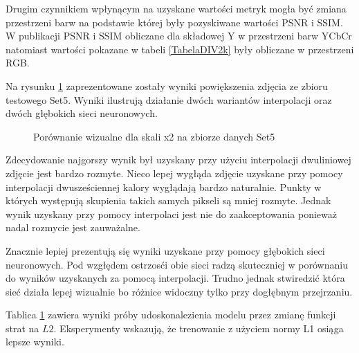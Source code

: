 \documentclass[a4paper,12pt,twoside,openany]{report}
\newcommand{\ImgPath}{.}
\begin{document}
Drugim czynnikiem wpłynącym na uzyskane wartości metryk mogła być zmiana przestrzeni barw na podstawie której były pozyskiwane wartości PSNR i  SSIM. W publikacji PSNR i SSIM obliczane dla składowej Y w przestrzeni barw YCbCr natomiast wartości pokazane w tabeli \ref{TabelaDIV2k} były obliczane w  przestrzeni RGB.

Na rysunku \ref{fig:DIv2k}  zaprezentowane zostały wyniki powiększenia zdjęcia ze zbioru testowego Set5. Wyniki ilustrują działanie dwóch wariantów interpolacji oraz dwóch głębokich sieci neuronowych. 

\begin{figure}[!htbp]
	\centering
	\caption{Porównanie wizualne dla skali  x2 na zbiorze danych Set5}
	\label{fig:DIv2k}
\end{figure}

Zdecydowanie najgorszy wynik był uzyskany przy użyciu interpolacji dwuliniowej zdjęcie jest bardzo rozmyte. Nieco lepej wygłąda zdjęcie uzyskane przy pomocy interpolacji dwusześciennej kalory wygłądają bardzo naturalnie. Punkty w których występują skupienia takich samych pikseli są mniej rozmyte. Jednak wynik uzyskany przy pomocy interpolaci jest nie do zaakceptowania ponieważ nadal rozmycie jest zauważalne.

Znacznie lepiej prezentują  się wyniki uzyskane przy pomocy głębokich sieci neuronowych. Pod wzgłędem ostrzosći obie sieci  radzą skuteczniej w porównaniu do wyników uzyskanych za  pomocą interpolacji. Trudno jednak stwiredzić która sieć działa lepej wizualnie  bo różnice widoczny tylko przy dogłębnym przejrzaniu. 

Tablica \ref{fig:DIv2k} zawiera wyniki próby udoskonalezienia modelu przez zmianę funkcji strat na $L2$. Eksperymenty wskazują, że trenowanie z użyciem normy L1 osiąga lepsze wyniki.
\newpage
\end{document}
